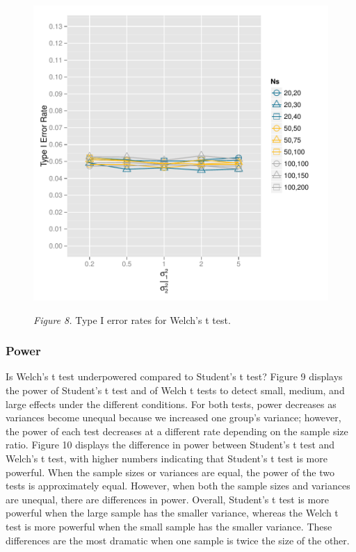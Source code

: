 \documentclass[man,a4paper,noextraspace,apacite]{apa6}
\begin{document}
\begin{figure}
\includegraphics{WelchManuscript-abridged-type1Welchplot}

\textit{Figure 8.} Type I error rates for Welch's t test.
\end{figure}

\subsubsection{Power}



    Is Welch's t test underpowered compared to Student's t test? Figure 9 displays the power of Student's t test and of Welch t tests to detect small, medium, and large effects under the different conditions. For both tests, power decreases as variances become unequal because we increased one group's variance; however, the power of each test decreases at a different rate depending on the sample size ratio. Figure 10 displays the difference in power between Student's t test and Welch's t test, with higher numbers indicating that Student's t test is more powerful. When the sample sizes or variances are equal, the power of the two tests is approximately equal. However, when both the sample sizes and variances are unequal, there are differences in power. Overall, Student's t test is more powerful when the large sample has the smaller variance, whereas the Welch t test is more powerful when the small sample has the smaller variance. These differences are the most dramatic when one sample is twice the size of the other. 
    
\end{document}
